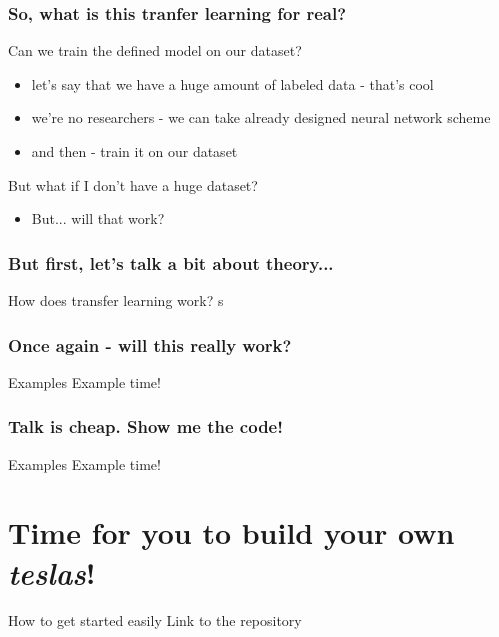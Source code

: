 \documentclass[aspectratio=1610,english]{beamer} %
\begin{document}
\section{So, what is this tranfer learning for real?}
 	\begin{frame}{Can we train the defined model on our dataset?}
		\begin{itemize}
			\item let's say that we have a huge amount of labeled data - that's cool
			\item we're no researchers - we can take already designed neural network scheme
			\item and then - train it on our dataset
		\end{itemize}
	\end{frame}
 
 	\begin{frame}{But what if I don't have a huge dataset?}
 		\begin{itemize}
		 	\item But... will that work? 
		 \end{itemize}
	\end{frame}

\section{But first, let's talk a bit about theory...}
  	\begin{frame}{How does transfer learning work?}
		s%
	 \end{frame}
 
 \section{Once again - will this really work?}
  	\begin{frame}{Examples}
		Example time!
	\end{frame}
  	
  	\section{Talk is cheap. Show me the code!}
	\begin{frame}{Examples}
	Example time!
	\end{frame}
	
	
\part{Time for you to build your own \textit{teslas}!}
	\begin{frame}{How to get started easily}
	Link to the repository
	\end{frame}
\end{document}
